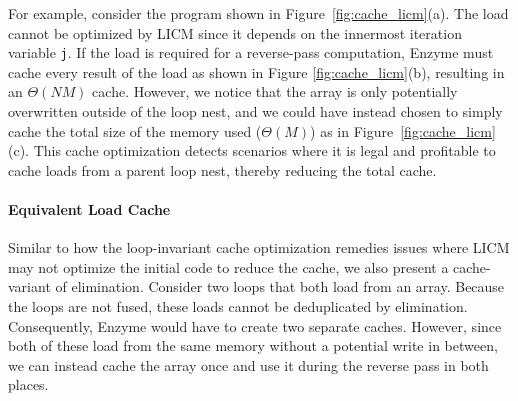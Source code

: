 For example, consider the program shown in Figure~\ref{fig:cache_licm}(a). The load cannot be optimized by LICM since it depends on the innermost iteration variable \texttt{j}. If the load is required for a reverse-pass computation, Enzyme must cache every result of the load as shown in Figure \ref{fig:cache_licm}(b), resulting in an $\Theta(NM)$ cache. However, we notice that the array is only potentially overwritten outside of the loop nest, and we could have instead chosen to simply cache the total size of the memory used ($\Theta(M)$) as in Figure~\ref{fig:cache_licm}(c). This cache optimization detects scenarios where it is legal and profitable to cache loads from a parent loop nest, thereby reducing the total cache.

\paragraph{\textbf{Equivalent Load Cache}}
Similar to how the loop-invariant cache optimization remedies issues where LICM may not optimize the initial code to reduce the cache, we also present a cache-variant of  elimination. Consider two loops that both load from an array. Because the loops are not fused, these loads cannot be deduplicated by  elimination. Consequently, Enzyme would have to create two separate caches. However, since both of these load from the same memory without a potential write in between, we can instead cache the array once and use it during the reverse pass in both places. 


